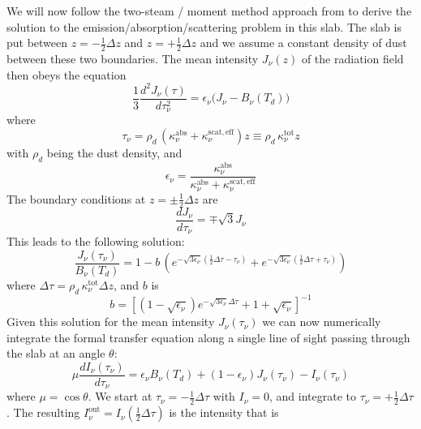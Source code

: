 \documentclass{aa}
\begin{document}
We will now follow the two-steam / moment method approach from
\citet{1986rpa..book.....R} to derive the solution to the
emission/absorption/scattering problem in this slab. The slab is put between
$z=-\tfrac{1}{2}\Delta z$ and $z=+\tfrac{1}{2}\Delta z$ and we assume a constant
density of dust between these two boundaries. The mean intensity $J_\nu(z)$
of the radiation field then obeys the equation
\begin{equation}
\frac{1}{3}\frac{d^2J_\nu(\tau)}{d\tau_\nu^2} = \epsilon_\nu \big(J_\nu-B_\nu(T_d)\big)
\end{equation}
where
\begin{equation}
  \tau_\nu=\rho_d\,(\kappa_\nu^{\mathrm{abs}}+\kappa_\nu^{\mathrm{scat,eff}}) z
  \equiv \rho_d\, \kappa_\nu^{\mathrm{tot}} z
\end{equation}
with $\rho_d$ being the dust density, and
\begin{equation}
\epsilon_\nu = \frac{\kappa_\nu^{\mathrm{abs}}}{\kappa_\nu^{\mathrm{abs}}+\kappa_\nu^{\mathrm{scat,eff}}}
\end{equation}
The boundary conditions at $z=\pm\tfrac{1}{2}\Delta z$ are
\begin{equation}
\frac{dJ_\nu}{d\tau_\nu} = \mp \sqrt{3}J_\nu
\end{equation}
This leads to the following solution:
\begin{equation}
  \frac{J_\nu(\tau_\nu)}{B_\nu(T_d)} =  1-b\,
    \left(e^{-\sqrt{3\epsilon_\nu}\left(\tfrac{1}{2}\Delta\tau-\tau_\nu\right)}+e^{-\sqrt{3\epsilon_\nu}\left(\tfrac{1}{2}\Delta\tau+\tau_\nu\right)}\right)
\end{equation}
where $\Delta\tau = \rho_d\, \kappa_\nu^{\mathrm{tot}} \Delta z$, and $b$ is
\begin{equation}
b = \left[(1-\sqrt{\epsilon_\nu})e^{-\sqrt{3\epsilon_\nu}\Delta\tau} + 1 + \sqrt{\epsilon_\nu}\right]^{-1}
\end{equation}
Given this solution for the mean intensity $J_\nu(\tau_\nu)$ we can now numerically integrate
the formal transfer equation along a single line of sight passing through the slab at an
angle $\theta$:
\begin{equation}\label{eq-fte-slab-with-scat}
  \mu\frac{dI_\nu(\tau_\nu)}{d\tau_\nu} = \epsilon_\nu B_\nu(T_d) + (1-\epsilon_\nu) J_\nu(\tau_\nu)
  -I_\nu(\tau_\nu)
\end{equation}
where $\mu=\cos\theta$. We start at $\tau_\nu=-\tfrac{1}{2}\Delta \tau$ with
$I_\nu=0$, and integrate to $\tau_\nu=+\tfrac{1}{2}\Delta \tau$. The resulting
$I_\nu^{\mathrm{out}}=I_\nu(\tfrac{1}{2}\Delta \tau)$ is the intensity that is
\end{document}
